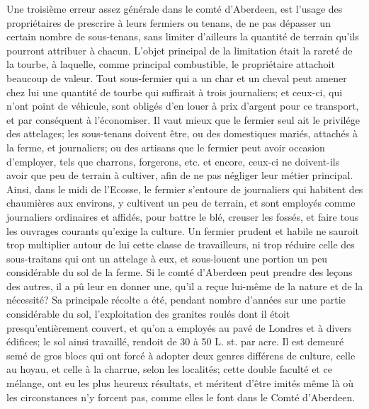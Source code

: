Une troisième erreur assez générale dans\setcounter{page}{346} le comté d'Aberdeen, est l'usage des propriétaires de prescrire à leurs fermiers ou tenans, de ne pas dépasser un certain nombre de sous-tenans, sans limiter d'ailleurs la quantité de terrain qu'ils pourront attribuer à chacun. L'objet principal de la limitation était la rareté de la tourbe, à laquelle, comme principal combustible, le propriétaire attachoit beaucoup de valeur. Tout sous-fermier qui a un char et un cheval peut amener chez lui une quantité de tourbe qui suffirait à trois journaliers; et ceux-ci, qui n'ont point de véhicule, sont obligés d'en louer à prix d'argent pour ce transport, et par conséquent à l'économiser. Il vaut mieux que le fermier seul ait le privilége des attelages; les sous-tenans doivent être, ou des domestiques mariés, attachés à la ferme, et journaliers; ou des artisans que le fermier peut avoir occasion d'employer, tels que charrons, forgerons, etc. et encore, ceux-ci ne doivent-ils avoir que peu de terrain à cultiver, afin de ne pas négliger leur métier principal. Ainsi, dans le midi de l'Ecosse, le fermier s'entoure de journaliers qui habitent des chaumières aux environs, y cultivent un peu de terrain, et sont employés comme journaliers ordinaires et affidés, pour battre le blé, creuser les fossés, et faire tous les\setcounter{page}{347} ouvrages courants qu'exige la culture. Un fermier prudent et habile ne sauroit trop multiplier autour de lui cette classe de travailleurs, ni trop réduire celle des sous-traitans qui ont un attelage à eux, et sous-louent une portion un peu considérable du sol de la ferme.
Si le comté d'Aberdeen peut prendre des leçons des autres, il a pû leur en donner une, qu'il a reçue lui-même de la nature et de la nécessité? Sa principale récolte a été, pendant nombre d'années sur une partie considérable du sol, l'exploitation des granites roulés dont il étoit presqu'entièrement couvert, et qu'on a employés au pavé de Londres et à divers édifices; le sol ainsi travaillé, rendoit de 30 à 50 L. st. par acre. Il est demeuré semé de gros blocs qui ont forcé à adopter deux genres différens de culture, celle au hoyau, et celle à la charrue, selon les localités; cette double faculté et ce mélange, ont eu les plus heureux résultats, et méritent d'être imités même là où les circonstances n'y forcent pas, comme elles le font dans le Comté d'Aberdeen.